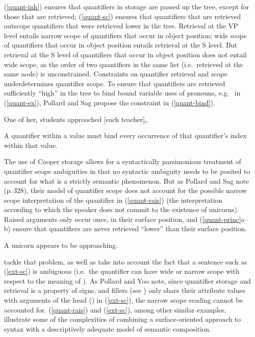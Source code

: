 \documentclass[output=paper
	        ,collection
	        ,collectionchapter
 	        ,biblatex
                ,babelshorthands
                ,newtxmath
                ,draftmode
                ,colorlinks, citecolor=brown
]{langscibook}
\begin{document}
(\ref{quant-inh}) ensures that quantifiers in storage are passed up the tree, except for those that are retrieved; (\ref{quant-sc}) ensures that quantifiers that are retrieved outscope quantifiers that were retrieved lower in the tree. Retrieval at the VP level entails narrow scope of quantifiers that occur in object position; wide scope of quantifiers that occur in object position entails retrieval at the S level. But retrieval at the S level of quantifiers that occur in object position does not entail wide scope, as the order of two quantifiers in the same  list (i.e.\ retrieved at the same node) is unconstrained. Constraints on quantifier retrieval and scope underdetermines quantifier scope. To ensure that quantifiers are retrieved sufficiently ``high'' in the tree to bind bound variable uses of pronouns, e.g.\  in (\ref{quant-ex}), Pollard and Sag propose the constraint in (\ref{quant-bind}).

\begin{exe}
\ex\label{quant-ex}
One of her$_{i}$ students approached [each teacher]$_{i}$. \citep[Example 27a]{PollardandSag1994}
\end{exe}

\begin{exe}
\ex\label{quant-bind}A quantifier within a  value must bind every occurrence of that quantifier's index within that  value.  
\end{exe}

The use of Cooper storage allows for a syntactically parsimonious treatment of quantifier scope ambiguities in that no syntactic ambiguity needs to be posited to account for what is a strictly semantic phenomenon. But as Pollard and Sag note (p.\,328), their model of quantifier scope does not account for the possible narrow scope interpretation of the quantifier  in (\ref{quant-rais}) (the interpretation according to which the speaker does not commit to the existence of unicorns). Raised arguments only occur once, in their surface position, and (\ref{quant-princ}a--b) ensure that quantifiers are never retrieved ``lower'' than their surface position.

\begin{exe}
\ex\label{quant-rais}A unicorn appears to be approaching.
\end{exe}

\citet{PollardandYoo1998} tackle that problem, as well as take into account the fact that a sentence such as (\ref{ext-sc}) is ambiguous (i.e.\ the quantifier  can have wide or narrow scope with respect to the meaning of ). As Pollard and Yoo note, since quantifier storage and retrieval is a property of signs, and fillers (see ) only share their  attribute values with arguments of the head () in (\ref{ext-sc}), the narrow scope reading cannot be accounted for. (\ref{quant-rais}) and (\ref{ext-sc}), among other similar examples, illustrate some of the complexities of combining a surface-oriented approach to syntax with a descriptively adequate model of semantic composition.
\end{document}
